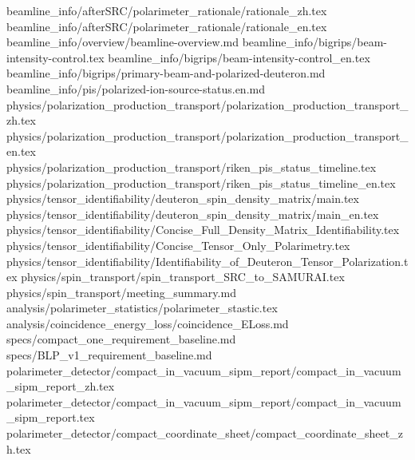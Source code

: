 \providecommand{\DocEntry}[2]{\expandafter\gdef\csname docpath:#1\endcsname{#2}}
\providecommand{\LocalDocEntry}[2]{\DocEntry{#1}{#2}}
\providecommand{\DocEngine}[2]{}
\providecommand{\DocPDF}[2]{\expandafter\gdef\csname docpdf:#1\endcsname{#2}}
\DocEntry{rationale-zh}{beamline_info/afterSRC/polarimeter_rationale/rationale_zh.tex}
\DocEntry{rationale-en}{beamline_info/afterSRC/polarimeter_rationale/rationale_en.tex}
\DocEntry{beamline}{beamline_info/overview/beamline-overview.md}
\DocEntry{beam-intensity}{beamline_info/bigrips/beam-intensity-control.tex}
\DocEntry{beam-intensity-en}{beamline_info/bigrips/beam-intensity-control_en.tex}
\DocEntry{primary-beam}{beamline_info/bigrips/primary-beam-and-polarized-deuteron.md}
\DocEntry{pis-status}{beamline_info/pis/polarized-ion-source-status.en.md}
\DocEntry{production-zh}{physics/polarization_production_transport/polarization_production_transport_zh.tex}
\DocEntry{production-en}{physics/polarization_production_transport/polarization_production_transport_en.tex}
\LocalDocEntry{pis-timeline}{physics/polarization_production_transport/riken_pis_status_timeline.tex}
\DocEntry{pis-timeline-en}{physics/polarization_production_transport/riken_pis_status_timeline_en.tex}
\LocalDocEntry{density-zh}{physics/tensor_identifiability/deuteron_spin_density_matrix/main.tex}
\LocalDocEntry{density-en}{physics/tensor_identifiability/deuteron_spin_density_matrix/main_en.tex}
\DocEntry{full-summary}{physics/tensor_identifiability/Concise_Full_Density_Matrix_Identifiability.tex}
\DocEntry{tensor-summary}{physics/tensor_identifiability/Concise_Tensor_Only_Polarimetry.tex}
\DocEntry{identifiability}{physics/tensor_identifiability/Identifiability_of_Deuteron_Tensor_Polarization.tex}
\DocEntry{spin-transport}{physics/spin_transport/spin_transport_SRC_to_SAMURAI.tex}
\DocEntry{spin-summary}{physics/spin_transport/meeting_summary.md}
\DocEntry{statistics}{analysis/polarimeter_statistics/polarimeter_stastic.tex}
\DocEntry{coincidence}{analysis/coincidence_energy_loss/coincidence_ELoss.md}
\DocEntry{requirements}{specs/compact_one_requirement_baseline.md}
\DocEntry{legacy-requirements}{specs/BLP_v1_requirement_baseline.md}
\DocEntry{detector-zh}{polarimeter_detector/compact_in_vacuum_sipm_report/compact_in_vacuum_sipm_report_zh.tex}
\DocEntry{detector-en}{polarimeter_detector/compact_in_vacuum_sipm_report/compact_in_vacuum_sipm_report.tex}
\DocEntry{coordinates}{polarimeter_detector/compact_coordinate_sheet/compact_coordinate_sheet_zh.tex}
